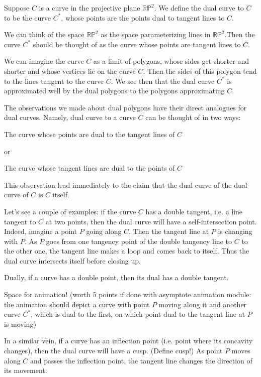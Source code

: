 Suppose $C$ is a curve in the projective plane $\mathbb{RP}^2$. We define the dual curve to $C$ to be the curve $C^*$, whose points are the points dual to tangent lines to $C$.

We can think of the space $\mathbb{RP}^2$ as the space parameterizing lines in $\mathbb{RP}^2$.Then the curve $C^*$ should be thought of as the curve whose points are tangent lines to $C$. 

We can imagine the curve $C$ as a limit of polygons, whose sides get shorter and shorter and whose vertices lie on the curve $C$. Then the sides of this polygon tend to the lines tangent to the curve $C$. We see then that the dual curve $C^*$ is approximated well by the dual polygons to the polygons approximating $C$.

The observations we made about dual polygons have their direct analogues for dual curves. Namely, dual curve to a curve $C$ can be thought of in two ways:

The curve whose points are dual to the tangent lines of $C$

or

The curve whose tangent lines are dual to the points of $C$

This observation lead immediately to the claim that the dual curve of the dual curve of $C$ is $C$ itself.

Let's see a couple of examples: if the curve $C$ has a double tangent, i.e. a line tangent to $C$ at two points, then the dual curve will have a self-intersection point. Indeed, imagine a point $P$ going along $C$. Then the tangent line at $P$ is changing with $P$. As $P$ goes from one tangency point of the double tangency line to $C$ to the other one, the tangent line makes a loop and comes back to itself. Thus the dual curve intersects itself before closing up.

Dually, if a curve has a double point, then its dual has a double tangent.

Space for animation! (worth 5 points if done with asymptote animation module: the animation should depict a curve with point $P$ moving along it and another curve $C^*$, which is dual to the first, on which point dual to the tangent line at $P$ is moving)

In a similar vein, if a curve has an inflection point (i.e. point where its concavity changes), then the dual curve will have a cusp. (Define cusp!) As point $P$ moves along $C$ and passes the inflection point, the tangent line changes the direction of its movement.

